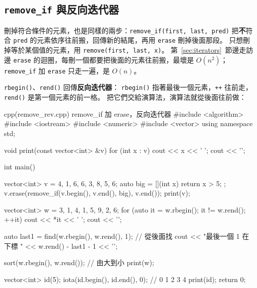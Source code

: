 \subsection{\texttt{remove\_if} 與反向迭代器}

刪掉符合條件的元素，也是同樣的兩步：\texttt{remove\_if(first, last, pred)}
把\textbf{不}符合 \texttt{pred} 的元素依序往前搬，回傳新的結尾，再用
\texttt{erase} 刪掉後面那段。 只想刪掉等於某個值的元素，用
\texttt{remove(first, last, x)}。 第~\ref{sec:iterators}~節邊走訪邊
\texttt{erase} 的迴圈，每刪一個都要把後面的元素往前搬，最壞是 $O(n^2)$；
\texttt{remove\_if} 加 \texttt{erase} 只走一遍，是 $O(n)$。

\texttt{rbegin()}、\texttt{rend()} 回傳\textbf{反向迭代器}：
\texttt{rbegin()} 指著最後一個元素，\texttt{++} 往前走，\texttt{rend()}
是第一個元素的前一格。 把它們交給演算法，演算法就從後面往前做：

\begin{example}[label=ex:remove-rev]{cpp}{(remove\_rev.cpp) remove\_if 加 erase，反向迭代器}
#include <algorithm>
#include <iostream>
#include <numeric>
#include <vector>
using namespace std;

void print(const vector<int> &v) {
    for (int x : v) {
        cout << x << ' ';
    }
    cout << '\n';
}

int main() {
    vector<int> v = {4, 1, 6, 6, 3, 8, 5, 6};
    auto big = [](int x) { return x > 5; };
    v.erase(remove_if(v.begin(), v.end(), big), v.end());
    print(v);

    vector<int> w = {3, 1, 4, 1, 5, 9, 2, 6};
    for (auto it = w.rbegin(); it != w.rend(); ++it) {
        cout << *it << ' ';
    }
    cout << '\n';

    auto last1 = find(w.rbegin(), w.rend(), 1);    // 從後面找
    cout << "最後一個 1 在下標 " << w.rend() - last1 - 1 << '\n';

    sort(w.rbegin(), w.rend());                     // 由大到小
    print(w);

    vector<int> id(5);
    iota(id.begin(), id.end(), 0);                  // 0 1 2 3 4
    print(id);
    return 0;
}
\end{example}


